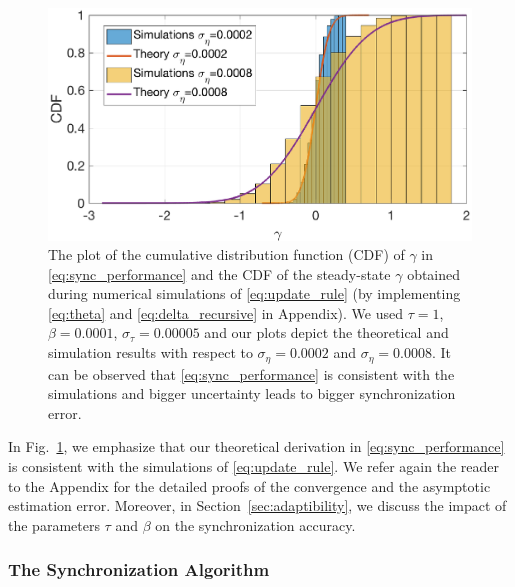 \documentclass[10pt,journal,compsoc]{IEEEtran}
\begin{document}
\begin{figure}
	\centering
	\includegraphics[width=\columnwidth]{figures/sim-theory.eps}
	\caption{\label{fig:theory-vs-simulations} The plot of the cumulative distribution function (CDF) of $\gamma$ in \eqref{eq:sync_performance} and the CDF of the steady-state $\gamma$ obtained during numerical simulations of \eqref{eq:update_rule} (by implementing \eqref{eq:theta} and \eqref{eq:delta_recursive} in Appendix). We used $\tau=1$, $\beta= 0.0001$, $\sigma_{\tau}=0.00005$ and our plots depict the theoretical and simulation results with respect to $\sigma_\eta = 0.0002$ and $\sigma_\eta = 0.0008.$ It can be observed that \eqref{eq:sync_performance} is consistent with the simulations and bigger uncertainty leads to bigger synchronization error.}
\end{figure}
In Fig.~\ref{fig:theory-vs-simulations}, we emphasize that our theoretical derivation in \eqref{eq:sync_performance} is consistent with the simulations of \eqref{eq:update_rule}. We refer again the reader to the Appendix for the detailed proofs of the convergence and the asymptotic estimation error. Moreover, in Section~\ref{sec:adaptibility}, we discuss the impact of the parameters $\tau$ and $\beta$ on the synchronization accuracy.

\subsubsection{The Synchronization Algorithm}
\end{document}
